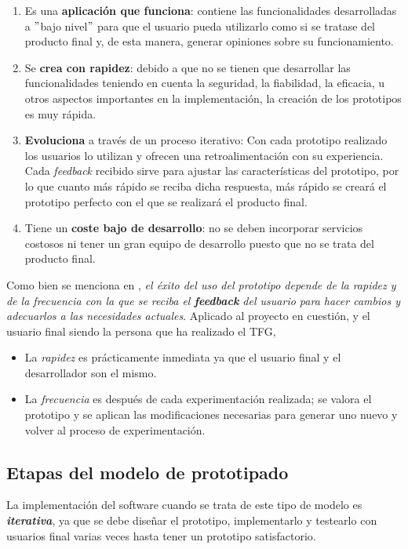 \begin{enumerate}
    \item Es una \textbf{aplicación que funciona}: contiene las funcionalidades desarrolladas a $"$bajo nivel$"$ para que el usuario pueda utilizarlo como si se tratase del producto final y, de esta manera, generar opiniones sobre su funcionamiento.
    \item Se \textbf{crea con rapidez}: debido a que no se tienen que desarrollar las funcionalidades teniendo en cuenta la seguridad, la fiabilidad, la eficacia, u otros aspectos importantes en la implementación, la creación de los prototipos es muy rápida. 
    \item \textbf{Evoluciona} a través de un proceso iterativo:  Con cada prototipo realizado los usuarios lo utilizan y ofrecen una retroalimentación con su experiencia. Cada \textit{feedback} recibido sirve para ajustar las características del prototipo, por lo que cuanto más rápido se reciba dicha respuesta, más rápido se creará el prototipo perfecto con el que se realizará el producto final. 
    \item Tiene un \textbf{coste bajo de desarrollo}: no se deben incorporar servicios costosos ni tener un gran equipo de desarrollo puesto que no se trata del producto final. 
\end{enumerate}

Como bien se menciona en \cite{calameoModeloPrototipado}, \textit{el éxito del uso del prototipo depende de la rapidez y de la frecuencia con la que se reciba el \textbf{feedback} del usuario para hacer cambios y adecuarlos a las necesidades actuales}. Aplicado al proyecto en cuestión, y el usuario final siendo la persona que ha realizado el TFG, 

\begin{itemize}
    \item La \textit{rapidez} es prácticamente inmediata ya que el usuario final y el desarrollador son el mismo.
    \item La \textit{frecuencia} es después de cada experimentación realizada; se valora el prototipo y se aplican las modificaciones necesarias para generar uno nuevo y volver al proceso de experimentación.
\end{itemize}

\subsection{Etapas del modelo de prototipado}

La implementación del software cuando se trata de este tipo de modelo es \textbf{\textit{iterativa}}, ya que se debe diseñar el prototipo, implementarlo y testearlo con usuarios final varias veces hasta tener un prototipo satisfactorio. \\

